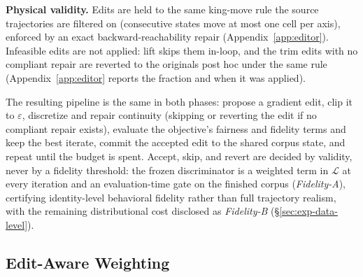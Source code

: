 \textbf{Physical validity.} Edits are held to the same king-move rule the
source trajectories are filtered on (consecutive states move at most one
cell per axis), enforced by an exact backward-reachability repair
(Appendix~\ref{app:editor}). Infeasible edits are not applied: lift skips
them in-loop, and the trim edits with no compliant repair are reverted to the
originals post hoc under the same rule
(Appendix~\ref{app:editor} reports the fraction and when it was applied).

The resulting pipeline is the same in both phases: propose a gradient edit,
clip it to $\varepsilon$, discretize and repair continuity (skipping or
reverting the edit if no compliant repair exists), evaluate the objective's
fairness and fidelity terms and keep the best iterate, commit the accepted
edit to the shared corpus state, and repeat until the budget is spent.
Accept, skip, and revert are decided by validity, never by a fidelity
threshold: the frozen discriminator is a weighted term in $\mathcal{L}$ at
every iteration and an evaluation-time gate on the finished corpus
(\emph{Fidelity-A}), certifying identity-level behavioral fidelity rather than
full trajectory realism, with the remaining distributional cost disclosed as
\emph{Fidelity-B} (\S\ref{sec:exp-data-level}).

\subsection{Edit-Aware Weighting}\label{sec:downstream}

